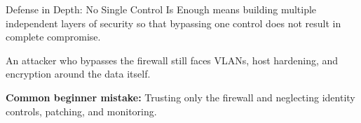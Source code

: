 \documentclass[aspectratio=169]{beamer}  %
\begin{document}
\begin{frame}{Defense in Depth: No Single Control Is Enough}
    \footnotesize
     means building multiple independent layers of security so that bypassing one control does not result in complete compromise.

    \vspace{0.2em}
    \begin{center}
    \end{center}
    \footnotesize
    An attacker who bypasses the firewall still faces VLANs, host hardening, and encryption around the data itself.

    \vspace{0.2em}
    \textbf{Common beginner mistake:} Trusting only the firewall and neglecting identity controls, patching, and monitoring.
\end{frame}
\end{document}

